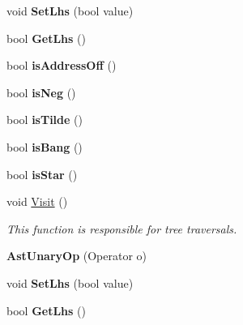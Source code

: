 \begin{DoxyCompactItemize}
\item 
\hypertarget{classAstUnaryOp_a8fa646529a84c26cab9b3e39ed1c726c}{void {\bfseries Set\-Lhs} (bool value)}\label{classAstUnaryOp_a8fa646529a84c26cab9b3e39ed1c726c}

\item 
\hypertarget{classAstUnaryOp_a00fb9d26303867cc8ed269df7092975f}{bool {\bfseries Get\-Lhs} ()}\label{classAstUnaryOp_a00fb9d26303867cc8ed269df7092975f}

\item 
\hypertarget{classAstUnaryOp_a636862fa8cc5f8308eeed666e8cce5a4}{bool {\bfseries is\-Address\-Off} ()}\label{classAstUnaryOp_a636862fa8cc5f8308eeed666e8cce5a4}

\item 
\hypertarget{classAstUnaryOp_a7dddcaa6c182d6012e35d124c25c8e22}{bool {\bfseries is\-Neg} ()}\label{classAstUnaryOp_a7dddcaa6c182d6012e35d124c25c8e22}

\item 
\hypertarget{classAstUnaryOp_a02f2cdfdcf75a4c41cfd2168465c16b0}{bool {\bfseries is\-Tilde} ()}\label{classAstUnaryOp_a02f2cdfdcf75a4c41cfd2168465c16b0}

\item 
\hypertarget{classAstUnaryOp_ab9c6693eaa03da4daf18dc43f01c73d5}{bool {\bfseries is\-Bang} ()}\label{classAstUnaryOp_ab9c6693eaa03da4daf18dc43f01c73d5}

\item 
\hypertarget{classAstUnaryOp_aab9cd20f2a71757480827cb44b7cb0a3}{bool {\bfseries is\-Star} ()}\label{classAstUnaryOp_aab9cd20f2a71757480827cb44b7cb0a3}

\item 
void \hyperlink{classAstUnaryOp_a23e13d42f33d5882d58ca48e8053f1a0}{Visit} ()
\begin{DoxyCompactList}\small\item\em This function is responsible for tree traversals. \end{DoxyCompactList}\item 
\hypertarget{classAstUnaryOp_aa363b2df2fbb4653a683899e59df2080}{{\bfseries Ast\-Unary\-Op} (Operator o)}\label{classAstUnaryOp_aa363b2df2fbb4653a683899e59df2080}

\item 
\hypertarget{classAstUnaryOp_a8fa646529a84c26cab9b3e39ed1c726c}{void {\bfseries Set\-Lhs} (bool value)}\label{classAstUnaryOp_a8fa646529a84c26cab9b3e39ed1c726c}

\item 
\hypertarget{classAstUnaryOp_a00fb9d26303867cc8ed269df7092975f}{bool {\bfseries Get\-Lhs} ()}\label{classAstUnaryOp_a00fb9d26303867cc8ed269df7092975f}


\end{DoxyCompactItemize}
